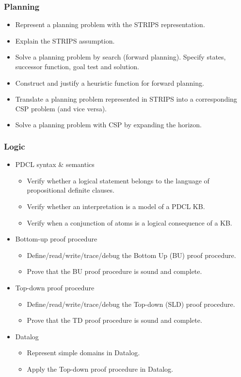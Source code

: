 \documentclass{article}
\begin{document}
\subsubsection{Planning}

\begin{itemize}
    \item Represent a planning problem with the STRIPS representation.
    \item Explain the STRIPS assumption.
    \item Solve a planning problem by search (forward planning). Specify states, successor function, goal test and solution.
    \item Construct and justify a heuristic function for forward planning.
    \item Translate a planning problem represented in STRIPS into a corresponding CSP problem (and vice versa).
    \item Solve a planning problem with CSP by expanding the horizon.
\end{itemize}

\subsubsection{Logic}

\begin{itemize}
    \item PDCL syntax \& semantics
        \begin{itemize}
            \item Verify whether a logical statement belongs to the language of propositional definite clauses.
            \item Verify whether an interpretation is a model of a PDCL KB.
            \item Verify when a conjunction of atoms is a logical consequence of a KB.
        \end{itemize}
    \item Bottom-up proof procedure
        \begin{itemize}
            \item Define/read/write/trace/debug the Bottom Up (BU) proof procedure.
            \item Prove that the BU proof procedure is sound and complete.
        \end{itemize}
    \item Top-down proof procedure
        \begin{itemize}
            \item Define/read/write/trace/debug the Top-down (SLD) proof procedure.
            \item Prove that the TD proof procedure is sound and complete.
        \end{itemize}
    \item Datalog
        \begin{itemize}
            \item Represent simple domains in Datalog.
            \item Apply the Top-down proof procedure in Datalog.
        \end{itemize}
\end{itemize}
\end{document}

